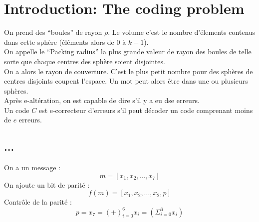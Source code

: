 \section{Introduction: The coding problem}
On prend des \enquote{boules} de rayon $\rho$. Le volume c'est le nombre d'élements contenus dans cette sphère (éléments alors de $0$ à $k-1$).\\
On appelle le \enquote{Packing radius} la plus grande valeur de rayon des boules de telle sorte que chaque centres des sphère soient disjointes.\\
On a alors le rayon de couverture. C'est le plus petit nombre pour des sphères de centres disjoints coupent l'espace. Un mot peut alors être dans une ou plusieurs sphères.\\
Après e-altération, on est capable de dire s'il y a eu dse erreurs.\\
Un code $C$ est e-correcteur d'erreurs s'il peut décoder un code comprenant moins de $e$ erreurs.\\
\subsection{...}
On a un message : \\
\begin{equation}
 m=[x_1, x_2, ..., x_7]
\end{equation} 
On ajoute un bit de parité :
\begin{equation}
 f(m)=[x_1, x_2, ..., x_2, p]
\end{equation}
Contrôle de la parité :
\begin{equation}
 p=x_7=(+)_{i=0}^{6}x_i=(\Sigma_{i=0}^{6}x_i)
\end{equation}

